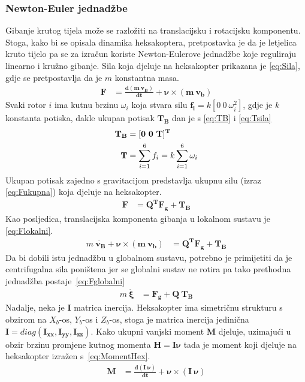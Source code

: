 \documentclass[times, utf8, diplomski]{fer}
\begin{document}
\subsubsection{Newton-Euler jednadžbe}
Gibanje krutog tijela može se razložiti na translacijsku i rotacijsku komponentu. Stoga, kako bi se opisala dinamika heksakoptera, pretpostavka je da je letjelica kruto tijelo pa se za izračun koriste Newton-Eulerove jednadžbe koje reguliraju linearno i kružno gibanje. Sila koja djeluje na heksakopter prikazana je \ref{eq:Sila}, gdje se pretpostavlja da je $m$ konstantna masa.
\begin{align}
\mathbf{F}&=\mathbf{\frac{d(m~v_B)}{dt}+\nu\times (m~v_b)} \label{eq:Sila}
\end{align}
Svaki rotor $i$ ima kutnu brzinu $\omega_i$ koja stvara silu $\mathbf{f_i}=k[0 ~0 ~\omega^2_i]$, gdje je $k$ konstanta potiska, dakle ukupan potisak  $\mathbf{T_B}$ dan je s \ref{eq:TB} i \ref{eq:Tsila}
\begin{align}
\centering
\mathbf{T_B}&=\mathbf{[0 ~0 ~T]^T} \label{eq:TB} \\
\mathbf{T}&=\sum_{i=1}^{6}f_i=k\sum_{i=1}^{6}\omega_i \label{eq:Tsila}
\end{align}
Ukupan potisak zajedno s gravitacijom predstavlja ukupnu silu (izraz \ref{eq:Fukupna}) koja djeluje na heksakopter.
\begin{align}
\mathbf{F}&=\mathbf{Q^TF_g+T_B} \label{eq:Fukupna}
\end{align}
Kao posljedica, translacijska komponenta gibanja u lokalnom sustavu je \ref{eq:Flokalni}.
\begin{align}
m~\mathbf{\dot{v_B}+\nu\times (m~v_b)}&=\mathbf{Q^TF_g+T_B} \label{eq:Flokalni}
\end{align}
Da bi dobili istu jednadžbu u globalnom sustavu, potrebno je primijetiti da je centrifugalna sila poništena jer se globalni sustav ne rotira pa tako prethodna jednadžba postaje~\ref{eq:Fglobalni}
\begin{align}
m~\mathbf{\ddot{\xi}}&=\mathbf{F_g+Q~T_B} \label{eq:Fglobalni}
\end{align}
Nadalje, neka je $\mathbf{I}$ matrica inercija. Heksakopter ima simetričnu strukturu s obzirom na $X_b$-os, $Y_b$-os i $Z_b$-os, stoga je matrica inercija jedinična $\mathbf{I}=diag(\mathbf{I_{xx}, I_{yy}, I_{zz}})$. Kako ukupni vanjski moment $\mathbf{M}$ djeluje, uzimajući u obzir brzinu promjene kutnog momenta  $\mathbf{H=I\nu}$ tada je moment koji djeluje na heksakopter izražen s~\ref{eq:MomentHex}.
\begin{align}
\mathbf{M}&=\mathbf{\frac{d(I~\nu)}{dt}+\nu\times(I~\nu)} \label{eq:MomentHex}
\end{align}
\end{document}
